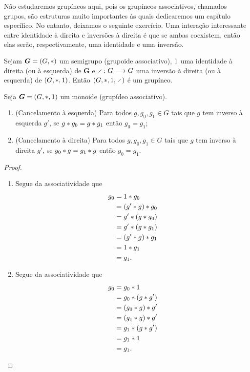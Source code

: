 Não estudaremos grupíneos aqui, pois os grupíneos associativos, chamados grupos, são estruturas muito importantes às quais dedicaremos um capítulo específico. No entanto, deixamos o seguinte exercício. Uma interação interessante entre identidade à direita e inversões à direita é que se ambas coexistem, então elas serão, respectivamente, uma identidade e uma inversão.

\begin{exercise}
Sejam $\bm G=(G,\ast)$ um semigrupo (grupoide associativo), $1$ uma identidade à direita (ou à esquerda) de $\bm G$ e $\fun{\div}{G}{G}$ uma inversão à direita (ou à esquerda) de $(G,\ast,1)$. Então $(G,\opb,1,\div)$ é um grupíneo.
\end{exercise}




\begin{proposition}[Cancelamento]
Seja $\bm G = (G,\ast,1)$ um monoide (grupídeo associativo).
	\begin{enumerate}
	\item (Cancelamento à esquerda) Para todos $g,g_0,g_1 \in G$ tais que $g$ tem inverso à esquerda $g'$, se $g \ast g_0 = g \ast g_1$ então $g_0=g_1$;
	\item (Cancelamento à direita) Para todos $g,g_0,g_1 \in G$ tais que $g$ tem inverso à direita $g'$, se $g_0 \ast g = g_1 \ast g$ então $g_0=g_1$.
	\end{enumerate}
\end{proposition}
\begin{proof}
	\begin{enumerate}
	\item Segue da associatividade que
		\begin{align*}
		g_0 &= 1 \ast g_0 \\
			&= (g' \ast g) \ast g_0 \\
			&= g' \ast (g \ast g_0) \\
			&= g' \ast (g \ast g_1) \\
			&= (g' \ast g) \ast g_1 \\
			&= 1 \ast g_1 \\
			&= g_1.
		\end{align*}

		\item Segue da associatividade que
		\begin{align*}
		g_0 &= g_0 \ast 1 \\
			&= g_0 \ast (g \ast g') \\
			&= (g_0 \ast g) \ast g' \\
			&= (g_1 \ast g) \ast g' \\
			&= g_1 \ast (g \ast g') \\
			&= g_1 \ast 1 \\
			&= g_1.
			\qedhere
		\end{align*}
	\end{enumerate}
\end{proof}

